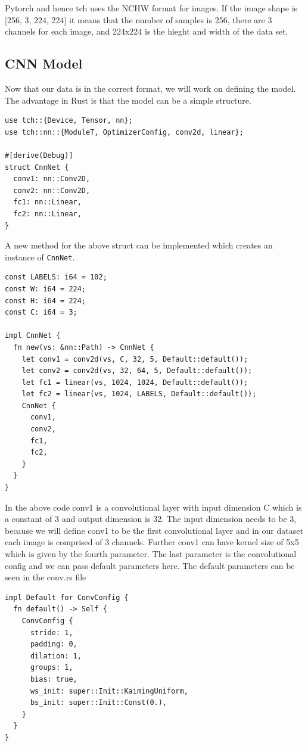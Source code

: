 \documentclass{book}
\begin{document}
Pytorch and hence tch uses the NCHW format for images. If the image shape is [256, 3, 224, 224] it means that the number of samples is 256, there are 3 channels for each image, and 224x224 is the hieght and width of the data set.

\label{sub:torch_dataset}
\subsection{CNN Model}%
Now that our data is in the correct format, we will work on defining the model. The advantage in Rust is that the model can be a simple structure.

\begin{lstlisting}[caption={chapter6/pytorch-image-classification/src/main.rs}, basicstyle=\small]
use tch::{Device, Tensor, nn};
use tch::nn::{ModuleT, OptimizerConfig, conv2d, linear};

#[derive(Debug)]
struct CnnNet {
  conv1: nn::Conv2D,
  conv2: nn::Conv2D,
  fc1: nn::Linear,
  fc2: nn::Linear,
}
\end{lstlisting}

A new method for the above struct can be implemented which creates an instance of \lstinline{CnnNet}.

\begin{lstlisting}[caption={chapter6/pytorch-image-classification/src/main.rs}, basicstyle=\small]
const LABELS: i64 = 102;
const W: i64 = 224;
const H: i64 = 224;
const C: i64 = 3;

impl CnnNet {
  fn new(vs: &nn::Path) -> CnnNet {
    let conv1 = conv2d(vs, C, 32, 5, Default::default());
    let conv2 = conv2d(vs, 32, 64, 5, Default::default());
    let fc1 = linear(vs, 1024, 1024, Default::default());
    let fc2 = linear(vs, 1024, LABELS, Default::default());
    CnnNet {
      conv1,
      conv2,
      fc1,
      fc2,
    }
  }
}
\end{lstlisting}

In the above code conv1 is a convolutional layer with input dimension C which is a constant of 3 and output dimension is 32. The input dimension needs to be 3, because we will define conv1 to be the first convolutional layer and in our dataset each image is comprised of 3 channels. Further conv1 can have kernel size of 5x5 which is given by the fourth parameter. The last parameter is the convolutional config and we can pass default parameters here. The default parameters can be seen in the conv.rs file

\begin{lstlisting}[caption={tch-rs/src/nn/conv.rs}, basicstyle=\small]
impl Default for ConvConfig {
  fn default() -> Self {
    ConvConfig {
      stride: 1,
      padding: 0,
      dilation: 1,
      groups: 1,
      bias: true,
      ws_init: super::Init::KaimingUniform,
      bs_init: super::Init::Const(0.),
    }
  }
}
\end{lstlisting}
\end{document}
